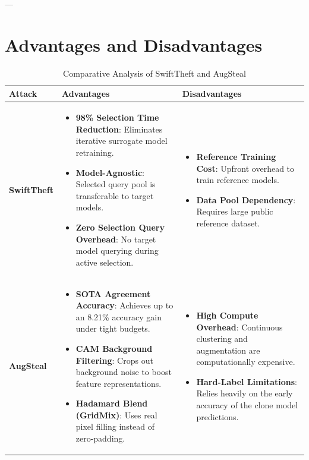 \documentclass{article}
\begin{document}
---


\section{Advantages and Disadvantages}

\begin{table}[h]
\centering
\caption{Comparative Analysis of SwiftTheft and AugSteal}
\begin{tabular}{p{2cm} p{6.5cm} p{6.5cm}}
\toprule
\textbf{Attack} & \textbf{Advantages} & \textbf{Disadvantages} \\
\midrule
\textbf{SwiftTheft} & 
\begin{itemize}
    \item \textbf{98\% Selection Time Reduction}: Eliminates iterative surrogate model retraining.
    \item \textbf{Model-Agnostic}: Selected query pool is transferable to target models.
    \item \textbf{Zero Selection Query Overhead}: No target model querying during active selection.
\end{itemize} & 
\begin{itemize}
    \item \textbf{Reference Training Cost}: Upfront overhead to train reference models.
    \item \textbf{Data Pool Dependency}: Requires large public reference dataset.
\end{itemize} \\
\midrule
\textbf{AugSteal} & 
\begin{itemize}
    \item \textbf{SOTA Agreement Accuracy}: Achieves up to an 8.21\% accuracy gain under tight budgets.
    \item \textbf{CAM Background Filtering}: Crops out background noise to boost feature representations.
    \item \textbf{Hadamard Blend (GridMix)}: Uses real pixel filling instead of zero-padding.
\end{itemize} & 
\begin{itemize}
    \item \textbf{High Compute Overhead}: Continuous clustering and augmentation are computationally expensive.
    \item \textbf{Hard-Label Limitations}: Relies heavily on the early accuracy of the clone model predictions.
\end{itemize} \\
\bottomrule
\end{tabular}
\end{table}
\end{document}
